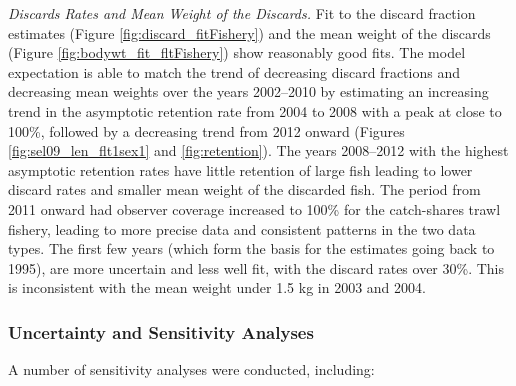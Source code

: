 \documentclass[12pt,]{article}
\begin{document}
\emph{Discards Rates and Mean Weight of the Discards.} Fit to the
discard fraction estimates (Figure \ref{fig:discard_fitFishery}) and the
mean weight of the discards (Figure \ref{fig:bodywt_fit_fltFishery})
show reasonably good fits. The model expectation is able to match the
trend of decreasing discard fractions and decreasing mean weights over
the years 2002--2010 by estimating an increasing trend in the asymptotic
retention rate from 2004 to 2008 with a peak at close to 100\%, followed
by a decreasing trend from 2012 onward (Figures
\ref{fig:sel09_len_flt1sex1} and \ref{fig:retention}). The years
2008--2012 with the highest asymptotic retention rates have little
retention of large fish leading to lower discard rates and smaller mean
weight of the discarded fish. The period from 2011 onward had observer
coverage increased to 100\% for the catch-shares trawl fishery, leading
to more precise data and consistent patterns in the two data types. The
first few years (which form the basis for the estimates going back to
1995), are more uncertain and less well fit, with the discard rates over
30\%. This is inconsistent with the mean weight under 1.5 kg in 2003 and
2004.

\hypertarget{uncertainty-and-sensitivity-analyses}{%
\subsubsection{Uncertainty and Sensitivity
Analyses}\label{uncertainty-and-sensitivity-analyses}}

A number of sensitivity analyses were conducted, including:
\end{document}
